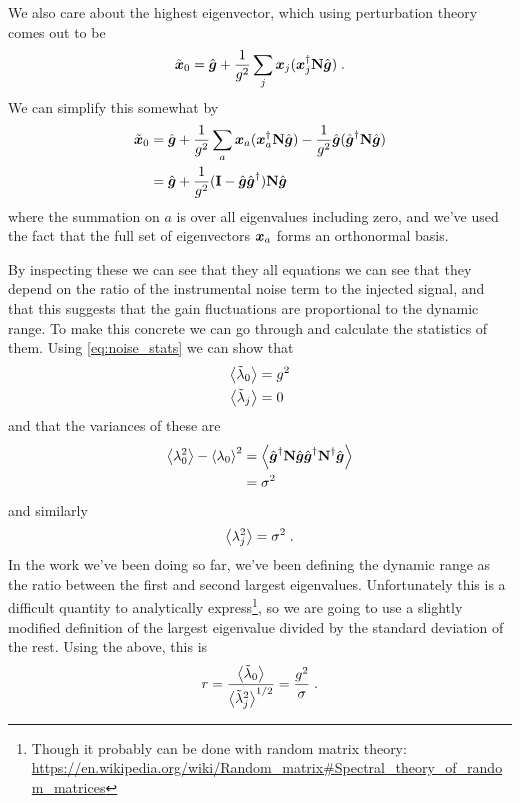 \documentclass[oldfontcommands,letter,11pt,oneside,article]{memoir}
\begin{document}
We also care about the highest eigenvector, which using perturbation theory comes out to be
\begin{equation}
\tilde{\boldsymbol{x}}_0 = \hat{\boldsymbol{g}} + \frac{1}{g^2} \sum_j \boldsymbol{x}_j ( \boldsymbol{x}_j^{\dagger} \boldsymbol{\mathbf{N}} \hat{\boldsymbol{g}} ) \; .
\end{equation}
We can simplify this somewhat by
\begin{align}
\tilde{\boldsymbol{x}}_0 & = \hat{\boldsymbol{g}} + \frac{1}{g^2} \sum_a \boldsymbol{x}_a ( \boldsymbol{x}_a^{\dagger} \boldsymbol{\mathbf{N}} \hat{\boldsymbol{g}} ) - \frac{1}{g^2} \hat{\boldsymbol{g}} ( \hat{\boldsymbol{g}}^{\dagger} \boldsymbol{\mathbf{N}} \hat{\boldsymbol{g}} )\\
& = \hat{\boldsymbol{g}} + \frac{1}{g^2} (\boldsymbol{\mathbf{I}} - \hat{\boldsymbol{g}}\hat{\boldsymbol{g}}^{\dagger}) \boldsymbol{\mathbf{N}} \hat{\boldsymbol{g}}
\end{align}
where the summation on $a$ is over all eigenvalues including zero, and we've
used the fact that the full set of eigenvectors $\boldsymbol{x}_a$ forms an orthonormal
basis.

By inspecting these we can see that they all equations we can see that they
depend on the ratio of the instrumental noise term to the injected signal, and
that this suggests that the gain fluctuations are proportional to the dynamic
range. To make this concrete we can go through and calculate the statistics of
them. Using \eqref{eq:noise_stats} we can show that
\begin{align}
\left\langle \tilde{\lambda}_0 \right\rangle & = g^2 \\
\left\langle \tilde{\lambda}_j \right\rangle & = 0
\end{align}
and that the variances of these are
\begin{align}
\left\langle \lambda_0^2 \right\rangle - \left\langle \lambda_0 \right\rangle^2 & = \left\langle \hat{\boldsymbol{g}}^{\dagger} \boldsymbol{\mathbf{N}} \hat{\boldsymbol{g}} \hat{\boldsymbol{g}}^{\dagger} \boldsymbol{\mathbf{N}}^{\dagger} \hat{\boldsymbol{g}} \right\rangle \\
& = \sigma^2
\end{align}
and similarly
\begin{equation}
\left\langle \lambda_j^2 \right\rangle = \sigma^2 \; .
\end{equation}
In the work we've been doing so far, we've been defining the dynamic range as
the ratio between the first and second largest eigenvalues. Unfortunately this
is a difficult quantity to analytically express\footnote{Though it probably can
be done with random matrix theory:
\url{https://en.wikipedia.org/wiki/Random_matrix\#Spectral_theory_of_random_matrices}},
so we are going to use a slightly modified definition of the largest eigenvalue
divided by the standard deviation of the rest. Using the above, this is
\begin{equation}
    \label{eq:dynamic_range}
    r = \frac{\left\langle \tilde{\lambda}_0 \right\rangle}{\left\langle \tilde{\lambda}_j^2 \right\rangle^{1/2}} = \frac{g^2}{\sigma} \; .
\end{equation}
\end{document}
